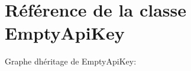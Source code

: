 \hypertarget{classEmptyApiKey}{}\section{Référence de la classe Empty\+Api\+Key}
\label{classEmptyApiKey}


Graphe d\textquotesingle{}héritage de Empty\+Api\+Key\+:
